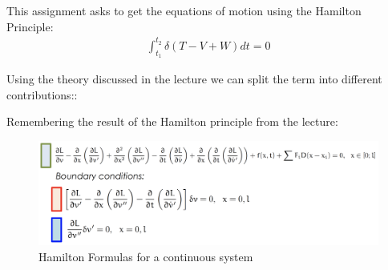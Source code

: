This assignment asks to get the equations of motion using the Hamilton Principle:
\begin{equation}
    \begin{split}
        \int_{t_1}^{t_2}\delta(T-V+W)dt = 0
    \end{split}
\end{equation}

Using the theory discussed in the lecture we can split the term into different contributions::


Remembering the result of the Hamilton principle from the lecture:

\begin{figure}[ht]
    \centering
    \includegraphics[scale=0.2]{images/Hamilton.png}
    \caption{Hamilton Formulas for a continuous system}
    \label{fig:hamilton}
\end{figure}

